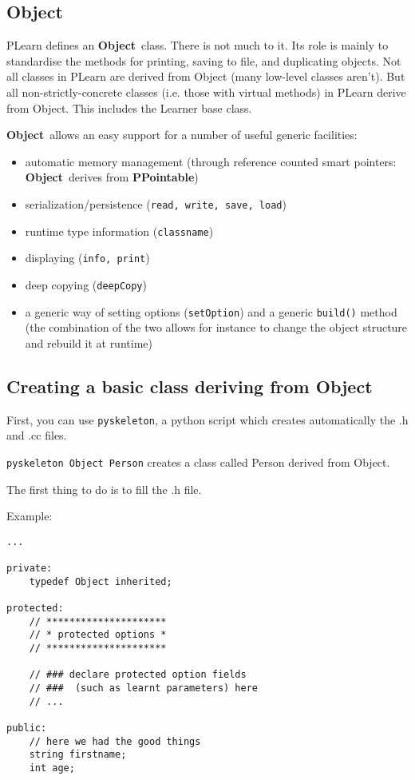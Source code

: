 \documentclass[11pt]{book}
\newcommand{\Object}{{\bf Object}}
\newcommand{\PPointable}{{\bf PPointable}}
\begin{document}
\subsection{\Object}

 PLearn defines an \Object\ class. There is not much to it. Its role
is mainly to standardise the methods for printing, saving to file, and
duplicating objects. Not all classes in PLearn are derived from Object
(many low-level classes aren't). But all non-strictly-concrete classes
(i.e. those with virtual methods) in PLearn derive from Object. This
includes the Learner base class.

\Object\ allows an easy support for a number of useful generic facilities:
\begin{itemize}
\item automatic memory management (through reference counted smart pointers: \Object\ derives from \PPointable)
\item serialization/persistence ({\tt read, write, save, load})
\item runtime type information ({\tt classname})
\item displaying ({\tt info, print})
\item deep copying ({\tt deepCopy})
\item a generic way of setting options ({\tt setOption}) and a generic
  {\tt build()} method (the combination of the two allows for instance
  to change the object structure and rebuild it at runtime)
\end{itemize}


\subsection{Creating a basic class deriving from Object}

First, you can use \texttt{pyskeleton}, a python script which creates
automatically the .h and .cc files.

\texttt{pyskeleton Object Person} creates a class called Person derived from Object.

The first thing to do is to fill the .h file.

Example:

\begin{verbatim}
...

private:
    typedef Object inherited;

protected:
    // *********************
    // * protected options *
    // *********************

    // ### declare protected option fields 
    // ###  (such as learnt parameters) here
    // ...

public:
    // here we had the good things
    string firstname;
    int age;

\end{verbatim}
\end{document}
